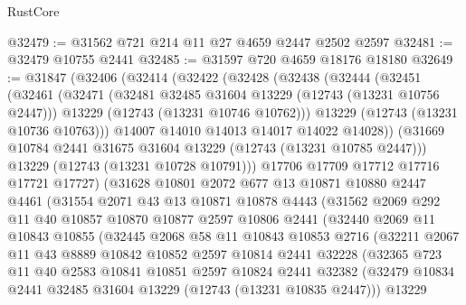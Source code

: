 \begin{lexlean}{RustCore}
\begin{coremodule}
@32479 := @31562 @721 @214 @11 @27 @4659 @2447 @2502 @2597
@32481 := @32479 @10755 @2441
@32485 := @31597 @720 @4659 @18176 @18180
@32649 := @31847
    (@32406
      (@32414
        (@32422
          (@32428
            (@32438
              (@32444
                (@32451
                  (@32461
                    (@32471
                      (@32481 @32485 @31604 @13229 (@12743 (@13231 @10756 @2447)))
                      @13229
                      (@12743 (@13231 @10746 @10762)))
                    @13229
                    (@12743 (@13231 @10736 @10763)))
                  @14007
                  @14010
                  @14013
                  @14017
                  @14022
                  @14028))
              (@31669 @10784 @2441 @31675 @31604 @13229 (@12743 (@13231 @10785 @2447)))
              @13229
              (@12743 (@13231 @10728 @10791)))
            @17706
            @17709
            @17712
            @17716
            @17721
            @17727)
          (@31628
            @10801
            @2072
            @677
            @13
            @10871
            @10880
            @2447
            @4461
            (@31554
              @2071
              @43
              @13
              @10871
              @10878
              @4443
              (@31562
                @2069
                @292
                @11
                @40
                @10857
                @10870
                @10877
                @2597
                @10806
                @2441
                (@32440
                  @2069
                  @11
                  @10843
                  @10855
                  (@32445
                    @2068
                    @58
                    @11
                    @10843
                    @10853
                    @2716
                    (@32211
                      @2067
                      @11
                      @43
                      @8889
                      @10842
                      @10852
                      @2597
                      @10814
                      @2441
                      @32228
                      (@32365
                        @723
                        @11
                        @40
                        @2583
                        @10841
                        @10851
                        @2597
                        @10824
                        @2441
                        @32382
                        (@32479 @10834 @2441 @32485 @31604 @13229 (@12743 (@13231 @10835 @2447)))
                        @13229

\end{coremodule}
\end{lexlean}
